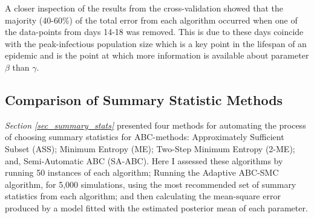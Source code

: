 \documentclass[11pt,a4paper]{article}
\theoremstyle{break}
\begin{document}
  \par A closer inspection of the results from the cross-validation showed that the majority (40-60\%) of the total error from each algorithm occurred when one of the data-points from days 14-18 was removed. This is due to these days coincide with the peak-infectious population size which is a key point in the lifespan of an epidemic and is the point at which more information is available about parameter $\beta$ than $\gamma$.

\subsection{Comparison of Summary Statistic Methods}\label{sec_comparison_of_ss_methods}

  \par \textit{Section \ref{sec_summary_stats}} presented four methods for automating the process of choosing summary statistics for ABC-methods: Approximately Sufficient Subset (ASS); Minimum Entropy (ME); Two-Step Minimum Entropy (2-ME); and, Semi-Automatic ABC (SA-ABC). Here I assessed these algorithms by running 50 instances of each algorithm; Running the Adaptive ABC-SMC algorithm, for 5,000 simulations, using the most recommended set of summary statistics from each algorithm; and then calculating the mean-square error produced by a model fitted with the estimated posterior mean of each parameter.
\end{document}
